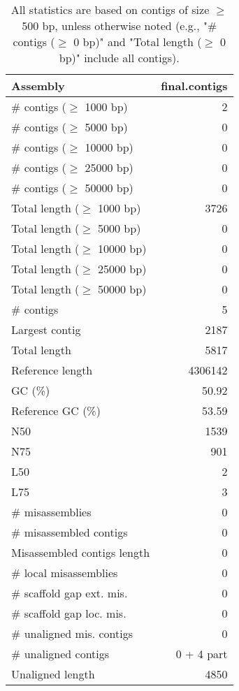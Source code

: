 \documentclass[12pt,a4paper]{article}
\begin{document}
\begin{table}[ht]
\begin{center}
\caption{All statistics are based on contigs of size $\geq$ 500 bp, unless otherwise noted (e.g., "\# contigs ($\geq$ 0 bp)" and "Total length ($\geq$ 0 bp)" include all contigs).}
\begin{tabular}{|l*{1}{|r}|}
\hline
Assembly & final.contigs \\ \hline
\# contigs ($\geq$ 1000 bp) & 2 \\ \hline
\# contigs ($\geq$ 5000 bp) & 0 \\ \hline
\# contigs ($\geq$ 10000 bp) & 0 \\ \hline
\# contigs ($\geq$ 25000 bp) & 0 \\ \hline
\# contigs ($\geq$ 50000 bp) & 0 \\ \hline
Total length ($\geq$ 1000 bp) & 3726 \\ \hline
Total length ($\geq$ 5000 bp) & 0 \\ \hline
Total length ($\geq$ 10000 bp) & 0 \\ \hline
Total length ($\geq$ 25000 bp) & 0 \\ \hline
Total length ($\geq$ 50000 bp) & 0 \\ \hline
\# contigs & 5 \\ \hline
Largest contig & 2187 \\ \hline
Total length & 5817 \\ \hline
Reference length & 4306142 \\ \hline
GC (\%) & 50.92 \\ \hline
Reference GC (\%) & 53.59 \\ \hline
N50 & 1539 \\ \hline
N75 & 901 \\ \hline
L50 & 2 \\ \hline
L75 & 3 \\ \hline
\# misassemblies & 0 \\ \hline
\# misassembled contigs & 0 \\ \hline
Misassembled contigs length & 0 \\ \hline
\# local misassemblies & 0 \\ \hline
\# scaffold gap ext. mis. & 0 \\ \hline
\# scaffold gap loc. mis. & 0 \\ \hline
\# unaligned mis. contigs & 0 \\ \hline
\# unaligned contigs & 0 + 4 part \\ \hline
Unaligned length & 4850 \\ \hline

\end{tabular}
\end{center}
\end{table}
\end{document}
